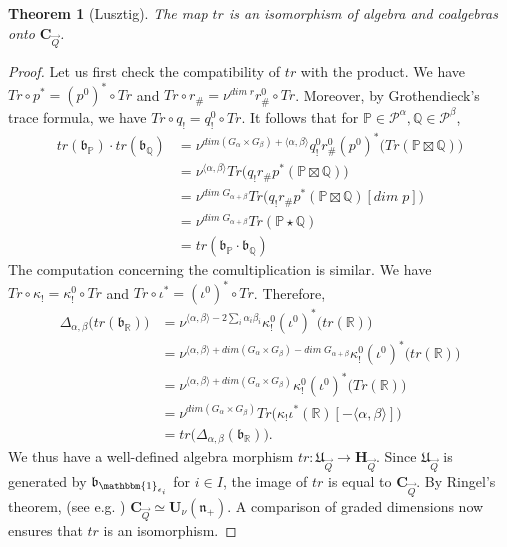 \documentclass[a4paper,10pt]{amsart}
\def\H{\mathbf{H}}
\def\U{\mathbf{U}}
\def\a{\alpha}
\def\bo{\mathfrak{b}}
\def\n{\mathfrak{n}}
\newtheorem{theo}{\bf{Theorem}}[section]
\numberwithin{equation}{section}
\begin{document}
\vspace{.1in}

\begin{theo}[Lusztig]\label{T:Lu2} The map $tr$ is an isomorphism of algebra and coalgebras onto $\mathbf{C}_{\vec{Q}}$.
\end{theo}
\begin{proof} Let us first check the compatibility of $tr$ with the product. We have $Tr \circ p^* = (p^0)^* \circ Tr$ and $Tr \circ
r_{\#}=\nu^{dim\;r} r^0_{\#} \circ Tr$. Moreover, by Grothendieck's trace formula, we have $Tr \circ q_!=q^0_! \circ Tr$. It follows that for $\mathbb{P} \in \mathcal{P}^{\a}, \mathbb{Q} \in \mathcal{P}^{\beta}$,
\begin{equation*}
\begin{split}
tr(\bo_\mathbb{P})\cdot tr(\bo_\mathbb{Q})&= \nu^{dim(G_{\a} \times G_{\beta}) + \langle \a, \beta \rangle} q^0_! r^0_{\#} (p^0)^* \big( Tr(\mathbb{P} \boxtimes \mathbb{Q})\big)\\
&=\nu^{\langle \a,\beta\rangle} Tr \big(q_!r_{\#} p^* (\mathbb{P} \boxtimes \mathbb{Q})\big)\\
&=\nu^{dim\;G_{\a+\beta}} Tr\big(q_!r_{\#} p^* (\mathbb{P} \boxtimes \mathbb{Q})[dim\;p]\big)\\
&=\nu^{dim\;G_{\a+\beta}} Tr( \mathbb{P} \star \mathbb{Q})\\
&=tr(\bo_{\mathbb{P}} \cdot \bo_{\mathbb{Q}})
\end{split}
\end{equation*}
The computation concerning the comultiplication is similar. We have $Tr \circ \kappa_!=\kappa^0_! \circ Tr$ and $ Tr \circ \iota^*=(\iota^0)^* \circ Tr$. Therefore,
\begin{equation*}
\begin{split}
\Delta_{\a,\beta}\big(tr(\bo_{\mathbb{R}})\big)&= \nu^{\langle \a,\beta \rangle -2\sum_i \a_i \beta_i} \kappa^0_! (\iota^0)^* \big(tr(\mathbb{R})\big)\\
&= \nu^{\langle \a, \beta \rangle + dim( G_{\a} \times G_{\beta})-dim\;G_{\a+\beta}}  \kappa^0_! (\iota^0)^* \big(tr(\mathbb{R})\big)\\
&=\nu^{\langle \a, \beta \rangle + dim( G_{\a} \times G_{\beta})}  \kappa^0_! (\iota^0)^* \big(Tr(\mathbb{R})\big)\\
&=\nu^{dim(G_{\a} \times G_{\beta})} Tr \big( \kappa_! \iota^* (\mathbb{R})[-\langle \a, \beta \rangle ]\big)\\
&=tr \big({\Delta}_{\a,\beta}(\bo_{\mathbb{R}})\big).
\end{split}
\end{equation*}
We thus have a well-defined algebra morphism $tr:\mathfrak{U}_{\vec{Q}} \to \H_{\vec{Q}}$. Since $\mathfrak{U}_{\vec{Q}}$ is generated by $\bo_{\mathbbm{1}_{\epsilon_i}}$ for $i \in I$, the image of $tr$ is equal to $\mathbf{C}_{\vec{Q}}$. By Ringel's theorem, (see e.g. \cite[Lecture~3]{Trieste}) $\mathbf{C}_{\vec{Q}} \simeq \U_{\nu}(\n_+)$. A comparison of graded dimensions now ensures that $tr$ is an isomorphism.
\end{proof}
\end{document}
